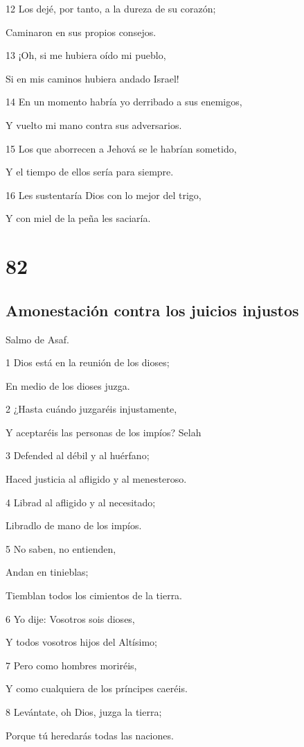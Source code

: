\par 12 Los dejé, por tanto, a la dureza de su corazón;
\par Caminaron en sus propios consejos.
\par 13 ¡Oh, si me hubiera oído mi pueblo,
\par Si en mis caminos hubiera andado Israel!
\par 14 En un momento habría yo derribado a sus enemigos,
\par Y vuelto mi mano contra sus adversarios.
\par 15 Los que aborrecen a Jehová se le habrían sometido,
\par Y el tiempo de ellos sería para siempre.
\par 16 Les sustentaría Dios con lo mejor del trigo,
\par Y con miel de la peña les saciaría.

\chapter{82}

\section*{Amonestación contra los juicios injustos}

\par Salmo de Asaf.

\par 1 Dios está en la reunión de los dioses;
\par En medio de los dioses juzga.
\par 2 ¿Hasta cuándo juzgaréis injustamente,
\par Y aceptaréis las personas de los impíos? Selah
\par 3 Defended al débil y al huérfano;
\par Haced justicia al afligido y al menesteroso.
\par 4 Librad al afligido y al necesitado;
\par Libradlo de mano de los impíos.
\par 5 No saben, no entienden,
\par Andan en tinieblas;
\par Tiemblan todos los cimientos de la tierra.
\par 6 Yo dije: Vosotros sois dioses,
\par Y todos vosotros hijos del Altísimo;
\par 7 Pero como hombres moriréis,
\par Y como cualquiera de los príncipes caeréis.
\par 8 Levántate, oh Dios, juzga la tierra;
\par Porque tú heredarás todas las naciones.

